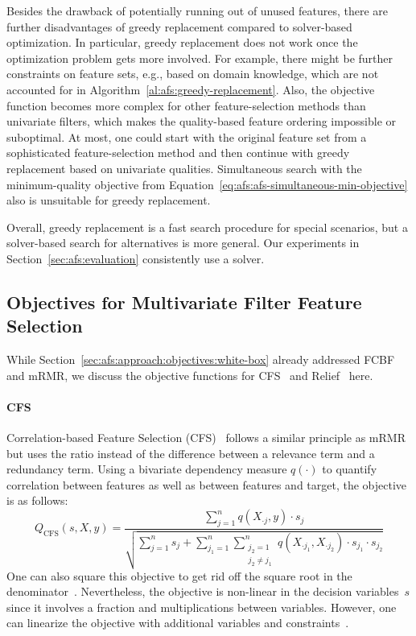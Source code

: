 \documentclass{article}
\theoremstyle{definition}
\begin{document}
Besides the drawback of potentially running out of unused features, there are further disadvantages of greedy replacement compared to solver-based optimization.
In particular, greedy replacement does not work once the optimization problem gets more involved.
For example, there might be further constraints on feature sets, e.g., based on domain knowledge, which are not accounted for in Algorithm~\ref{al:afs:greedy-replacement}.
Also, the objective function becomes more complex for other feature-selection methods than univariate filters, which makes the quality-based feature ordering impossible or suboptimal.
At most, one could start with the original feature set from a sophisticated feature-selection method and then continue with greedy replacement based on univariate qualities.
Simultaneous search with the minimum-quality objective from Equation~\ref{eq:afs:afs-simultaneous-min-objective} also is unsuitable for greedy replacement.

Overall, greedy replacement is a fast search procedure for special scenarios, but a solver-based search for alternatives is more general.
Our experiments in Section~\ref{sec:afs:evaluation} consistently use a solver.

\subsection{Objectives for Multivariate Filter Feature Selection}
\label{sec:afs:appendix:multivariate-filter-objectives}

While Section~\ref{sec:afs:approach:objectives:white-box} already addressed FCBF and mRMR, we discuss the objective functions for CFS~\cite{hall1999correlation, hall2000correlation} and Relief~\cite{kira1992feature, robnik1997adaptation} here.

\paragraph{CFS}

Correlation-based Feature Selection (CFS)~\cite{hall1999correlation, hall2000correlation} follows a similar principle as mRMR but uses the ratio instead of the difference between a relevance term and a redundancy term.
Using a bivariate dependency measure $q(\cdot)$ to quantify correlation between features as well as between features and target, the objective is as follows:
%
\begin{equation}
	Q_{\text{CFS}}(s,X,y) = \frac{\sum_{j=1}^{n} q(X_{\cdot{}j},y) \cdot s_j}{\sqrt{\sum_{j=1}^{n} s_j + \sum_{j_1=1}^{n} \sum_{\substack{j_2=1 \\ j_2 \neq j_1}}^{n} q(X_{\cdot{}j_1}, X_{\cdot{}j_2}) \cdot s_{j_1} \cdot s_{j_2}}}
	\label{eq:afs:cfs}
\end{equation}
%
One can also square this objective to get rid off the square root in the denominator~\cite{nguyen2010towards}.
Nevertheless, the objective is non-linear in the decision variables~$s$ since it involves a fraction and multiplications between variables.
However, one can linearize the objective with additional variables and constraints~\cite{nguyen2010improving, nguyen2010towards}.
\end{document}

